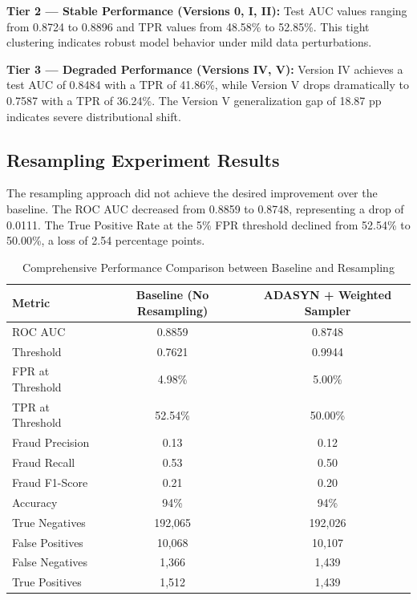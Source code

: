 \textbf{Tier 2 --- Stable Performance (Versions 0, I, II):} Test AUC values ranging from 0.8724 to 0.8896 and TPR values from 48.58\% to 52.85\%. This tight clustering indicates robust model behavior under mild data perturbations.

\textbf{Tier 3 --- Degraded Performance (Versions IV, V):} Version IV achieves a test AUC of 0.8484 with a TPR of 41.86\%, while Version V drops dramatically to 0.7587 with a TPR of 36.24\%. The Version V generalization gap of 18.87 pp indicates severe distributional shift.

\subsection{Resampling Experiment Results}

The resampling approach did not achieve the desired improvement over the baseline. The ROC AUC decreased from 0.8859 to 0.8748, representing a drop of 0.0111. The True Positive Rate at the 5\% FPR threshold declined from 52.54\% to 50.00\%, a loss of 2.54 percentage points.

\begin{table}[H]
\centering
\tablestrut
\caption{Comprehensive Performance Comparison between Baseline and Resampling}
\label{tab:gnn-resample-results}
\small
\begin{tabularx}{\textwidth}{Xcc}
\toprule
\textbf{Metric} & \textbf{Baseline (No Resampling)} & \textbf{ADASYN + Weighted Sampler} \\
\midrule
ROC AUC         & 0.8859  & 0.8748 \\
Threshold & 0.7621  & 0.9944 \\
FPR at Threshold & 4.98\%  & 5.00\% \\
TPR at Threshold & 52.54\% & 50.00\% \\
Fraud Precision  & 0.13    & 0.12 \\
Fraud Recall     & 0.53    & 0.50 \\
Fraud F1-Score   & 0.21    & 0.20 \\
Accuracy         & 94\%    & 94\% \\
True Negatives  & 192,065 & 192,026 \\
False Positives & 10,068  & 10,107 \\
False Negatives & 1,366   & 1,439 \\
True Positives  & 1,512   & 1,439 \\
\bottomrule
\end{tabularx}
\end{table}

